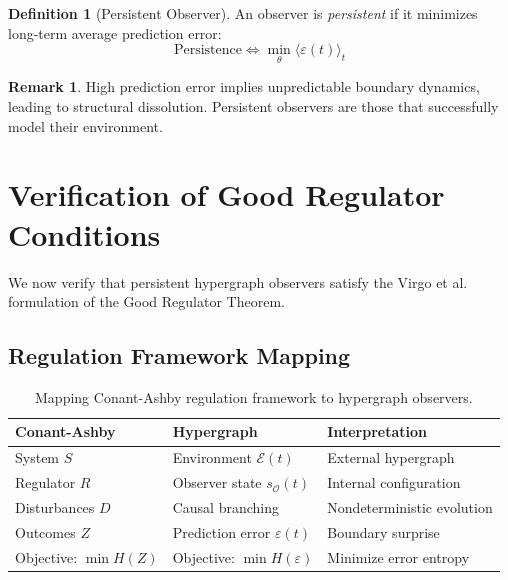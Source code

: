 \documentclass[11pt,a4paper]{article}
\theoremstyle{plain}
\theoremstyle{definition}
\newtheorem{definition}[theorem]{Definition}
\newtheorem{remark}[theorem]{Remark}
\theoremstyle{remark}
\newcommand{\eps}{\varepsilon}
\newcommand{\Ocal}{\mathcal{O}}
\begin{document}
\begin{definition}[Persistent Observer]
\label{def:persistent}
An observer is \emph{persistent} if it minimizes long-term average prediction error:
\begin{equation}
\text{Persistence} \iff \min_\theta \langle \eps(t) \rangle_t
\end{equation}
\end{definition}

\begin{remark}
High prediction error implies unpredictable boundary dynamics, leading to structural dissolution. Persistent observers are those that successfully model their environment.
\end{remark}


\section{Verification of Good Regulator Conditions}
\label{sec:good_regulator}

We now verify that persistent hypergraph observers satisfy the Virgo et al.~\cite{virgo2025good} formulation of the Good Regulator Theorem.

\subsection{Regulation Framework Mapping}

\begin{table}[h]
\centering
\begin{tabular}{lll}
\hline
\textbf{Conant-Ashby} & \textbf{Hypergraph} & \textbf{Interpretation} \\
\hline
System $S$ & Environment $\mathcal{E}(t)$ & External hypergraph \\
Regulator $R$ & Observer state $s_\Ocal(t)$ & Internal configuration \\
Disturbances $D$ & Causal branching & Nondeterministic evolution \\
Outcomes $Z$ & Prediction error $\eps(t)$ & Boundary surprise \\
Objective: $\min H(Z)$ & Objective: $\min H(\eps)$ & Minimize error entropy \\
\hline
\end{tabular}
\caption{Mapping Conant-Ashby regulation framework to hypergraph observers.}
\label{tab:ca_mapping}
\end{table}
\end{document}
